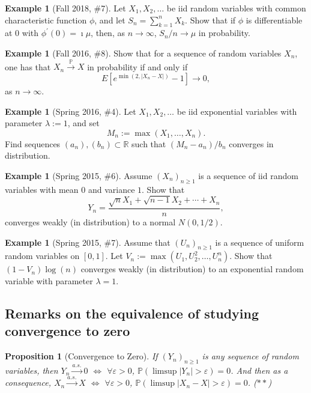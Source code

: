 \documentclass[12pt,reqno]{article}
\theoremstyle{plain}
\newtheorem{prop}[theorem]{Proposition}
\theoremstyle{definition}
\newtheorem{example}[theorem]{Example}
\newcommand{\PP}[1]{\ensuremath{\mathbb{P}\left(#1\right)}}
\begin{document}
\begin{example}[Fall 2018, \#7]
Let $X_1,X_2,\ldots$ be iid random variables with common characteristic 
function $\phi$, and let $S_n = \sum_{k=1}^n X_k$. Show that if $\phi$ is 
differentiable at $0$ with $\phi^{\prime}(0) = \imath\mu$, then, as 
$n \rightarrow \infty$, $S_n / n \rightarrow \mu$ in probability. 
\end{example} 

\begin{example}[Fall 2016, \#8]
Show that for a sequence of random variables $X_n$, one has that 
$X_n \xrightarrow{\mathbb{P}} X$ in probability if and only if 
\[
E\left[e^{\min(2, |X_n-X|)}-1\right] \longrightarrow 0, 
\]
as $n \rightarrow \infty$. 
\end{example} 

\begin{example}[Spring 2016, \#4]
Let $X_1,X_2,\ldots$ be iid exponential variables with parameter 
$\lambda := 1$, and set 
\[
M_n := \max(X_1, \ldots, X_n). 
\]
Find sequences $(a_n),(b_n) \subset \mathbb{R}$ such that 
$(M_n - a_n) / b_n$ converges in distribution. 
\end{example} 

\begin{example}[Spring 2015, \#6]
Assume $(X_n)_{n \geq 1}$ is a sequence of iid random variables with 
mean $0$ and variance $1$. Show that 
\[
Y_n = \frac{\sqrt{n}X_1+\sqrt{n-1}X_2 + \cdots + X_n}{n}, 
\]
converges weakly (in distribution) to a normal $N(0, 1/2)$. 
\end{example} 

\begin{example}[Spring 2015, \#7]
Assume that $(U_n)_{n \geq 1}$ is a sequence of uniform random variables on 
$[0, 1]$. Let $V_n := \max(U_1, U_2^2, \ldots, U_n^n)$. Show that 
$(1-V_n) \log(n)$ converges weakly (in distribution) to an exponential 
random variable with parameter $\lambda = 1$. 
\end{example} 

\subsection{Remarks on the equivalence of studying convergence to zero} 

\begin{prop}[Convergence to Zero]
If $(Y_n)_{n \geq 1}$ is any sequence of random variables, then 
$Y_n \xrightarrow{a.s.} 0$ $\iff$ $\forall \varepsilon > 0$, 
$\PP{\limsup |Y_n| > \varepsilon} = 0$. And then as a consequence, 
$X_n \xrightarrow{a.s.} X$ $\iff$ $\forall \varepsilon > 0$, 
$\PP{\limsup |X_n-X| > \varepsilon} = 0$. ($\ast\ast$) 
\end{prop} 
\end{document}
